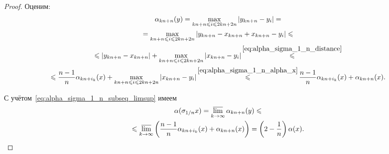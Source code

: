 \begin{proof}
	Оценим:
	\begin{multline}
		\alpha_{kn+n}(y)
		=
		\max_{kn+n \leq i \leq 2kn+2n } |y_{kn+n} - y_i|
		=
		\\=
		\max_{kn+n \leq i \leq 2kn+2n } |y_{kn+n} - x_{kn+n} + x_{kn+n} - y_i|
		\leq
		\\\leq
		|y_{kn+n} - x_{kn+n}| + \max_{kn+n \leq i \leq 2kn+2n } |x_{kn+n} - y_i|
		\mathop{\leq}^{\eqref{eq:alpha_sigma_1_n_distance}}
		\\\leq
		\frac{n-1}{n} \alpha_{kn+i_k}(x) + \max_{kn+n \leq i \leq 2kn+2n } |x_{kn+n} - y_i|
		\mathop{\leq}^{\eqref{eq:alpha_sigma_1_n_alpha_x}}
		\frac{n-1}{n} \alpha_{kn+i_k}(x)+\alpha_{kn+n}(x)
		.
	\end{multline}

	С учётом~\eqref{eq:alpha_sigma_1_n_subseq_limsup} имеем
	\begin{multline}
		\alpha(\sigma_{1/n}x)
		=
		\varlimsup_{k\to\infty} \alpha_{kn+n}(y)
		\leq
		\\\leq
		\varlimsup_{k\to\infty} \left( \frac{n-1}{n} \alpha_{kn+i_k}(x)+\alpha_{kn+n}(x) \right)
		=
		\left(2-\frac{1}{n}\right)\alpha(x)
		.
	\end{multline}
\end{proof}

